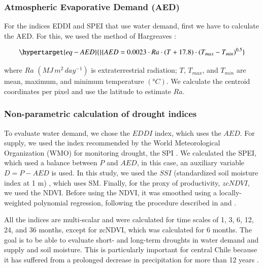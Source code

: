 \documentclass[
  authoryear,
  preprint,
  3p,
  onecolumn]{elsarticle}
\begin{document}
\hypertarget{atmospheric-evaporative-demand-aed}{%
\subsubsection{Atmospheric Evaporative Demand
(AED)}\label{atmospheric-evaporative-demand-aed}}

For the indices EDDI and SPEI that use water demand, first we have to
calculate the AED. For this, we used the method of Hargreaves
\citep{Hargreaves1994}:

\begin{equation}\protect\hypertarget{eq-AED}{}{AED = 0.0023\cdot Ra\cdot (T+17.8)\cdot (T_{max}-T_{min})^{0.5}}\label{eq-AED}\end{equation}

where \(Ra\) \((MJ\,m^2\, day^{-1})\) is extraterrestrial radiation;
\(T\), \(T_{max}\), and \(T_{min}\) are mean, maximum, and minimum
temperature \((°C)\). We calculate the centroid coordinates per pixel
and use the latitude to estimate \(Ra\).

\hypertarget{non-parametric-calculation-of-drought-indices}{%
\subsubsection{Non-parametric calculation of drought
indices}\label{non-parametric-calculation-of-drought-indices}}

To evaluate water demand, we chose the \(EDDI\)
\citep{Hobbins2016, McEvoy2016} index, which uses the \(AED\). For
supply, we used the index recommended by the World Meteorological
Organization (WMO) for monitoring drought, the SPI \citep{Mckee1993}. We
calculated the SPEI, which used a balance between \(P\) and \(AED\), in
this case, an auxiliary variable \(D = P-AED\) is used. In this study,
we used the \(SSI\) (standardized soil moisture index at 1 m)
\citep{Hao2013, AghaKouchak2014}, which uses SM. Finally, for the proxy
of productivity, \(zcNDVI\), we used the NDVI. Before using the NDVI, it
was smoothed using a locally-weighted polynomial regression, following
the procedure described in \citet{Zambrano2018} and
\citet{Zambrano2016}.

All the indices are multi-scalar and were calculated for time scales of
1, 3, 6, 12, 24, and 36 months, except for zcNDVI, which was calculated
for 6 months. The goal is to be able to evaluate short- and long-term
droughts in water demand and supply and soil moisture. This is
particularly important for central Chile because it has suffered from a
prolonged decrease in precipitation for more than 12 years
\citep{Garreaud2020, Boisier2018, Garreaud2017}.
\end{document}

